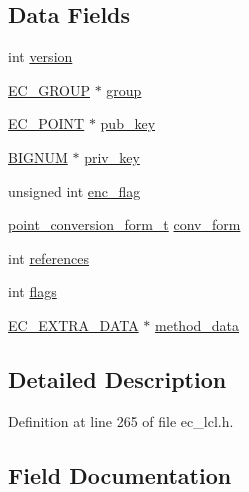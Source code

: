 \subsection*{Data Fields}
\begin{DoxyCompactItemize}
\item 
int \hyperlink{structec__key__st_aad880fc4455c253781e8968f2239d56f}{version}
\item 
\hyperlink{crypto_2ec_2ec_8h_aca3c2dfa5546740e0f575013960a598a}{E\+C\+\_\+\+G\+R\+O\+UP} $\ast$ \hyperlink{structec__key__st_a0753ef53cd980706f98c274a742a2c19}{group}
\item 
\hyperlink{crypto_2ec_2ec_8h_ab372a34de16c42eb0ccfa63be0ad985f}{E\+C\+\_\+\+P\+O\+I\+NT} $\ast$ \hyperlink{structec__key__st_a8e6d80a43754470c4d47bf12759b7e70}{pub\+\_\+key}
\item 
\hyperlink{crypto_2ossl__typ_8h_a6fb19728907ec6515e4bfb716bffa141}{B\+I\+G\+N\+UM} $\ast$ \hyperlink{structec__key__st_a7a27cca85dea48fc1c9086fe65651ec5}{priv\+\_\+key}
\item 
unsigned int \hyperlink{structec__key__st_ac86cb58ff810772ea1e0f1e560005d1a}{enc\+\_\+flag}
\item 
\hyperlink{crypto_2ec_2ec_8h_aa2c7ec2902c397d59393d357921e14b5}{point\+\_\+conversion\+\_\+form\+\_\+t} \hyperlink{structec__key__st_a4ca5d5f9bafb5f4d01a4c578ebd87688}{conv\+\_\+form}
\item 
int \hyperlink{structec__key__st_a146fdb34d9a909e530adf8b189481195}{references}
\item 
int \hyperlink{structec__key__st_ac8bf36fe0577cba66bccda3a6f7e80a4}{flags}
\item 
\hyperlink{ec__lcl_8h_a8de7b9aa3907b2405eef5bf0a996e023}{E\+C\+\_\+\+E\+X\+T\+R\+A\+\_\+\+D\+A\+TA} $\ast$ \hyperlink{structec__key__st_a3d84541d7ee3ef09f086be646c6c85e1}{method\+\_\+data}
\end{DoxyCompactItemize}


\subsection{Detailed Description}


Definition at line 265 of file ec\+\_\+lcl.\+h.



\subsection{Field Documentation}
